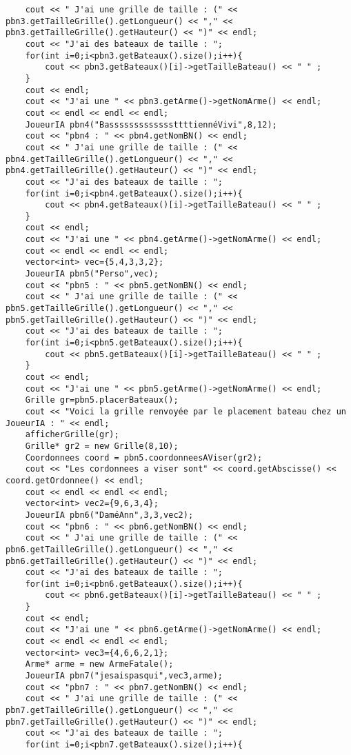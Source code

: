 \begin{lstlisting}
	cout << " J'ai une grille de taille : (" << pbn3.getTailleGrille().getLongueur() << "," << pbn3.getTailleGrille().getHauteur() << ")" << endl;
	cout << "J'ai des bateaux de taille : ";
	for(int i=0;i<pbn3.getBateaux().size();i++){
		cout << pbn3.getBateaux()[i]->getTailleBateau() << " " ;
	}
	cout << endl;
	cout << "J'ai une " << pbn3.getArme()->getNomArme() << endl;
	cout << endl << endl << endl;
	JoueurIA pbn4("BasssssssssssssttttiennéVivi",8,12);
	cout << "pbn4 : " << pbn4.getNomBN() << endl;
	cout << " J'ai une grille de taille : (" << pbn4.getTailleGrille().getLongueur() << "," << pbn4.getTailleGrille().getHauteur() << ")" << endl;
	cout << "J'ai des bateaux de taille : ";
	for(int i=0;i<pbn4.getBateaux().size();i++){
		cout << pbn4.getBateaux()[i]->getTailleBateau() << " " ;
	}
	cout << endl;
	cout << "J'ai une " << pbn4.getArme()->getNomArme() << endl;
	cout << endl << endl << endl;
	vector<int> vec={5,4,3,3,2};
	JoueurIA pbn5("Perso",vec);
	cout << "pbn5 : " << pbn5.getNomBN() << endl;
	cout << " J'ai une grille de taille : (" << pbn5.getTailleGrille().getLongueur() << "," << pbn5.getTailleGrille().getHauteur() << ")" << endl;
	cout << "J'ai des bateaux de taille : ";
	for(int i=0;i<pbn5.getBateaux().size();i++){
		cout << pbn5.getBateaux()[i]->getTailleBateau() << " " ;
	}
	cout << endl;
	cout << "J'ai une " << pbn5.getArme()->getNomArme() << endl;
	Grille gr=pbn5.placerBateaux();
	cout << "Voici la grille renvoyée par le placement bateau chez un JoueurIA : " << endl;
	afficherGrille(gr);
	Grille* gr2 = new Grille(8,10);
	Coordonnees coord = pbn5.coordonneesAViser(gr2);
	cout << "Les cordonnees a viser sont" << coord.getAbscisse() << coord.getOrdonnee() << endl;
	cout << endl << endl << endl;
	vector<int> vec2={9,6,3,4};
	JoueurIA pbn6("DaméAnn",3,3,vec2);
	cout << "pbn6 : " << pbn6.getNomBN() << endl;
	cout << " J'ai une grille de taille : (" << pbn6.getTailleGrille().getLongueur() << "," << pbn6.getTailleGrille().getHauteur() << ")" << endl;
	cout << "J'ai des bateaux de taille : ";
	for(int i=0;i<pbn6.getBateaux().size();i++){
		cout << pbn6.getBateaux()[i]->getTailleBateau() << " " ;
	}
	cout << endl;
	cout << "J'ai une " << pbn6.getArme()->getNomArme() << endl;
	cout << endl << endl << endl;
	vector<int> vec3={4,6,6,2,1};
	Arme* arme = new ArmeFatale();
	JoueurIA pbn7("jesaispasqui",vec3,arme);
	cout << "pbn7 : " << pbn7.getNomBN() << endl;
	cout << " J'ai une grille de taille : (" << pbn7.getTailleGrille().getLongueur() << "," << pbn7.getTailleGrille().getHauteur() << ")" << endl;
	cout << "J'ai des bateaux de taille : ";
	for(int i=0;i<pbn7.getBateaux().size();i++){

\end{lstlisting}

